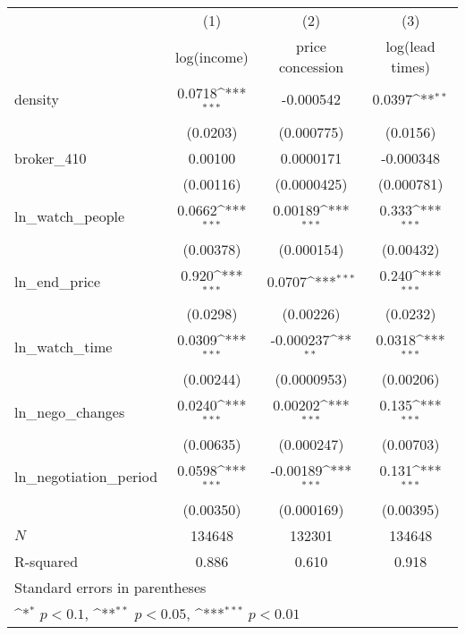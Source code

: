 {
\def\sym#1{\ifmmode^{#1}\else\(^{#1}\)\fi}
\begin{tabular}{l*{3}{c}}
\toprule
            &\multicolumn{1}{c}{(1)}&\multicolumn{1}{c}{(2)}&\multicolumn{1}{c}{(3)}\\
            &\multicolumn{1}{c}{log(income)}&\multicolumn{1}{c}{price concession}&\multicolumn{1}{c}{log(lead times)}\\
\midrule
density     &      0.0718\sym{***}&   -0.000542         &      0.0397\sym{**} \\
            &    (0.0203)         &  (0.000775)         &    (0.0156)         \\
\addlinespace
broker\_410  &     0.00100         &   0.0000171         &   -0.000348         \\
            &   (0.00116)         & (0.0000425)         &  (0.000781)         \\
\addlinespace
ln\_watch\_people&      0.0662\sym{***}&     0.00189\sym{***}&       0.333\sym{***}\\
            &   (0.00378)         &  (0.000154)         &   (0.00432)         \\
\addlinespace
ln\_end\_price&       0.920\sym{***}&      0.0707\sym{***}&       0.240\sym{***}\\
            &    (0.0298)         &   (0.00226)         &    (0.0232)         \\
\addlinespace
ln\_watch\_time&      0.0309\sym{***}&   -0.000237\sym{**} &      0.0318\sym{***}\\
            &   (0.00244)         & (0.0000953)         &   (0.00206)         \\
\addlinespace
ln\_nego\_changes&      0.0240\sym{***}&     0.00202\sym{***}&       0.135\sym{***}\\
            &   (0.00635)         &  (0.000247)         &   (0.00703)         \\
\addlinespace
ln\_negotiation\_period&      0.0598\sym{***}&    -0.00189\sym{***}&       0.131\sym{***}\\
            &   (0.00350)         &  (0.000169)         &   (0.00395)         \\
\midrule
\(N\)       &      134648         &      132301         &      134648         \\
R-squared   &       0.886         &       0.610         &       0.918         \\
\bottomrule
\multicolumn{4}{l}{\footnotesize Standard errors in parentheses}\\
\multicolumn{4}{l}{\footnotesize \sym{*} \(p<0.1\), \sym{**} \(p<0.05\), \sym{***} \(p<0.01\)}\\
\end{tabular}
}
